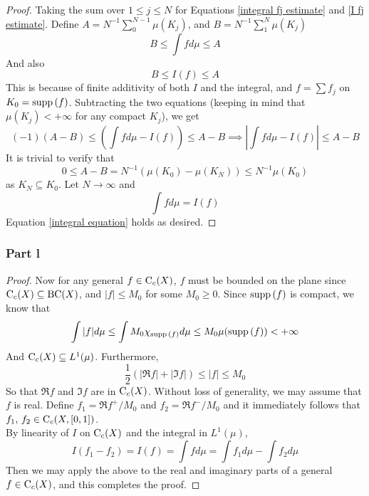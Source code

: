 \documentclass[../../main.tex]{subfiles}
\begin{document}
\begin{proof}
    Taking the sum over $1\leq j\leq N$ for Equations \eqref{integral fj estimate} and \eqref{I fj estimate}. Define $A = N^{-1}\sum_0^{N-1}\mu(K_j)$, and $B=N^{-1}\sum_1^{N}\mu(K_j)$
    \[
        B\leq \int fd\mu \leq A
    \]
    And also
    \[
        B\leq I(f)\leq A
    \]
    This is because of finite additivity of both $I$ and the integral, and $f = \sum f_j$ on $K_0=\operatorname{supp}{(f)}$. Subtracting the two equations (keeping in mind that $\mu(K_j)<+\infty$ for any compact $K_j$), we get
    \[
        (-1)(A-B)\leq \left(\int fd\mu - I(f)\right)\leq A-B\implies \left|\int fd\mu - I(f)\right|\leq A-B
    \]
    It is trivial to verify that 
    \[
    0\leq A-B = N^{-1}(\mu(K_0)-\mu(K_N))\leq N^{-1}\mu(K_0)
    \]
    as $K_N\subseteq K_0$. Let $N\to\infty$ and
    \[
    \int fd\mu = I(f)
    \]
    Equation \eqref{integral equation} holds as desired.
\end{proof}

\subsubsection*{Part l}
\begin{proof}
Now for any general $f\in\operatorname{C}_c({X})$, $f$ must be bounded on the plane since $\operatorname{C}_c({X})\subseteq \operatorname{BC}({X})$, and $|f|\leq M_0$ for some $M_0\geq 0$. Since $\operatorname{supp}{(f)}$ is compact, we know that 
\[
\int |f|d\mu\leq \int M_0\chi_{\operatorname{supp}{(f)}}d\mu\leq M_0\mu(\operatorname{supp}{(f)})<+\infty
\]
And $\operatorname{C}_c({X})\subseteq L^1(\mu)$. Furthermore,
\[
\frac{1}{2}( |\Re{f}| + |\Im{f}| ) \leq |f|\leq M_0
\]
So that $\Re{f}$ and $\Im{f}$ are in $\operatorname{C}_c({X})$. Without loss of generality, we may assume that $f$ is real. Define $f_1 = \Re{f}^+/M_0$ and $f_2 = \Re{f}^-/M_0$ and it immediately follows that $f_1,\,f_2\in\operatorname{C}_c({X,[0,1]})$.\\

By linearity of $I$ on $\operatorname{C}_c({X})$ and the integral in $L^1(\mu)$, 
\[
I(f_1-f_2) = I(f) = \int fd\mu = \int f_1d\mu - \int f_2d\mu
\]
Then we may apply the above to the real and imaginary parts of a general $f\in\operatorname{C}_c({X})$, and this completes the proof.
\end{proof}
\end{document}

